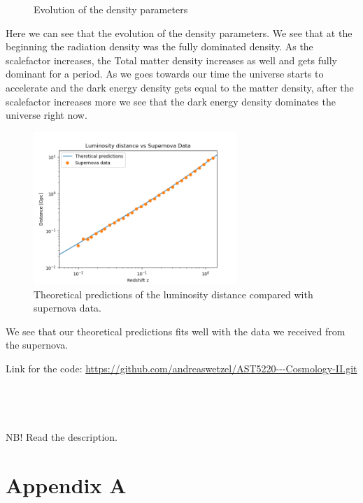 \documentclass{article}
\begin{document}
\begin{multicols}{2}
\begin{figure}[H]
	\caption{Evolution of the density parameters}
	\label{fig:Omega}
\end{figure}
Here we can see that the evolution of the density parameters. We see that at the beginning the radiation density was the fully dominated density. As the scalefactor increases, the Total matter density increases as well and gets fully dominant for a period. As we goes towards our time the universe starts to accelerate and the dark energy density gets equal to the matter density, after the scalefactor increases more we see that the dark energy density dominates the universe right now. \\
\begin{figure}[H]
	\centering
	\includegraphics[width=77mm]{LD_vs_SN.png}
	\caption{Theoretical predictions of the luminosity distance compared with supernova data.}
	\label{fig:LD_vs_SN}
\end{figure}
We see that our theoretical predictions fits well with the data we received from the supernova.
\end{multicols}
\clearpage
Link for the code: \url{https://github.com/andreaswetzel/AST5220---Cosmology-II.git}\\
\\
\\
\\
\\
NB! Read the description.
\clearpage
\appendix %

\section{Appendix A}
\label{A.1}
\end{document}
